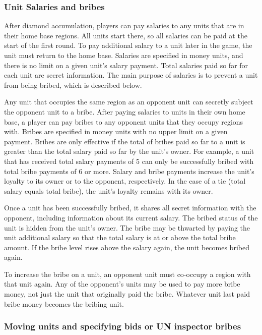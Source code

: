 \documentclass[8pt]{extarticle}
\begin{document}
\subsubsection{Unit Salaries and bribes}

After diamond accumulation, players can pay salaries to any units that are in their home base regions.  All units start there, so all salaries can be paid at the start of the first round.  To pay additional salary to a unit later in the game, the unit must return to the home base.  Salaries are specified in money units, and there is no limit on a given unit's salary payment.  Total salaries paid so far for each unit are secret information.  The main purpose of salaries is to prevent a unit from being bribed, which is described below.

Any unit that occupies the same region as an opponent unit can secretly subject the opponent unit to a bribe.  After paying salaries to units in their own home base, a player can pay bribes to any opponent units that they occupy regions with.  Bribes are specified in money units with no upper limit on a given payment.  Bribes are only effective if the total of bribes paid so far to a unit is greater than the total salary paid so far by the unit's owner.  For example, a unit that has received total salary payments of 5 can only be successfully bribed with total bribe payments of 6 or more.  Salary and bribe payments increase the unit's loyalty to its owner or to the opponent, respectively.  In the case of a tie (total salary equals total bribe), the unit's loyalty remains with its owner. 

Once a unit has been successfully bribed, it shares all secret information with the opponent, including information about its current salary.  The bribed status of the unit is hidden from the unit's owner.  The bribe may be thwarted by paying the unit additional salary so that the total salary is at or above the total bribe amount.  If the bribe level rises above the salary again, the unit becomes bribed again. 

To increase the bribe on a unit, an opponent unit must co-occupy a region with that unit again.  Any of the opponent's units may be used to pay more bribe money, not just the unit that originally paid the bribe.  Whatever unit last paid bribe money becomes the bribing unit.

\subsubsection{Moving units and specifying bids or UN inspector bribes}
\end{document}
